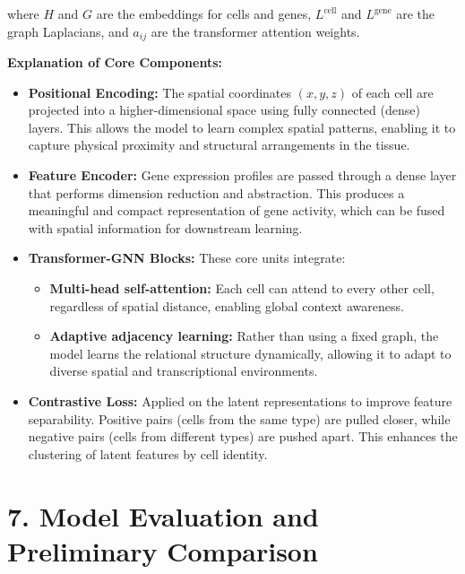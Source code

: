\documentclass[unnumsec,webpdf,contemporary,medium]{oup-authoring-template}
\begin{document}
\noindent where $H$ and $G$ are the embeddings for cells and genes, $L^{\text{cell}}$ and $L^{\text{gene}}$ are the graph Laplacians, and $a_{ij}$ are the transformer attention weights.

\vspace{1em}

\noindent\textbf{Explanation of Core Components:}

\begin{itemize}
    \item \textbf{Positional Encoding:} The spatial coordinates $(x, y, z)$ of each cell are projected into a higher-dimensional space using fully connected (dense) layers. This allows the model to learn complex spatial patterns, enabling it to capture physical proximity and structural arrangements in the tissue.

    \item \textbf{Feature Encoder:} Gene expression profiles are passed through a dense layer that performs dimension reduction and abstraction. This produces a meaningful and compact representation of gene activity, which can be fused with spatial information for downstream learning.

    \item \textbf{Transformer-GNN Blocks:} These core units integrate:
    \begin{itemize}
        \item \textbf{Multi-head self-attention:} Each cell can attend to every other cell, regardless of spatial distance, enabling global context awareness.
        \item \textbf{Adaptive adjacency learning:} Rather than using a fixed graph, the model learns the relational structure dynamically, allowing it to adapt to diverse spatial and transcriptional environments.
    \end{itemize}

    \item \textbf{Contrastive Loss:} Applied on the latent representations to improve feature separability. Positive pairs (cells from the same type) are pulled closer, while negative pairs (cells from different types) are pushed apart. This enhances the clustering of latent features by cell identity.
\end{itemize}
\section*{7. Model Evaluation and Preliminary Comparison}
\end{document}
